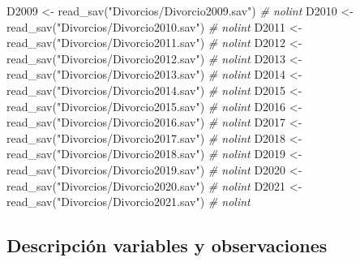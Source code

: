 \documentclass[
]{article}
\newenvironment{Shaded}{\begin{snugshade}}{\end{snugshade}}
\newcommand{\CommentTok}[1]{\textcolor[rgb]{0.56,0.35,0.01}{\textit{#1}}}
\newcommand{\FunctionTok}[1]{\textcolor[rgb]{0.00,0.00,0.00}{#1}}
\newcommand{\NormalTok}[1]{#1}
\newcommand{\OtherTok}[1]{\textcolor[rgb]{0.56,0.35,0.01}{#1}}
\newcommand{\StringTok}[1]{\textcolor[rgb]{0.31,0.60,0.02}{#1}}
\begin{document}
\begin{Shaded}
\begin{Highlighting}[]
\NormalTok{D2009 }\OtherTok{\textless{}{-}} \FunctionTok{read\_sav}\NormalTok{(}\StringTok{"Divorcios/Divorcio2009.sav"}\NormalTok{) }\CommentTok{\# nolint}
\NormalTok{D2010 }\OtherTok{\textless{}{-}} \FunctionTok{read\_sav}\NormalTok{(}\StringTok{"Divorcios/Divorcio2010.sav"}\NormalTok{) }\CommentTok{\# nolint}
\NormalTok{D2011 }\OtherTok{\textless{}{-}} \FunctionTok{read\_sav}\NormalTok{(}\StringTok{"Divorcios/Divorcio2011.sav"}\NormalTok{) }\CommentTok{\# nolint}
\NormalTok{D2012 }\OtherTok{\textless{}{-}} \FunctionTok{read\_sav}\NormalTok{(}\StringTok{"Divorcios/Divorcio2012.sav"}\NormalTok{) }\CommentTok{\# nolint}
\NormalTok{D2013 }\OtherTok{\textless{}{-}} \FunctionTok{read\_sav}\NormalTok{(}\StringTok{"Divorcios/Divorcio2013.sav"}\NormalTok{) }\CommentTok{\# nolint}
\NormalTok{D2014 }\OtherTok{\textless{}{-}} \FunctionTok{read\_sav}\NormalTok{(}\StringTok{"Divorcios/Divorcio2014.sav"}\NormalTok{) }\CommentTok{\# nolint}
\NormalTok{D2015 }\OtherTok{\textless{}{-}} \FunctionTok{read\_sav}\NormalTok{(}\StringTok{"Divorcios/Divorcio2015.sav"}\NormalTok{) }\CommentTok{\# nolint}
\NormalTok{D2016 }\OtherTok{\textless{}{-}} \FunctionTok{read\_sav}\NormalTok{(}\StringTok{"Divorcios/Divorcio2016.sav"}\NormalTok{) }\CommentTok{\# nolint}
\NormalTok{D2017 }\OtherTok{\textless{}{-}} \FunctionTok{read\_sav}\NormalTok{(}\StringTok{"Divorcios/Divorcio2017.sav"}\NormalTok{) }\CommentTok{\# nolint}
\NormalTok{D2018 }\OtherTok{\textless{}{-}} \FunctionTok{read\_sav}\NormalTok{(}\StringTok{"Divorcios/Divorcio2018.sav"}\NormalTok{) }\CommentTok{\# nolint}
\NormalTok{D2019 }\OtherTok{\textless{}{-}} \FunctionTok{read\_sav}\NormalTok{(}\StringTok{"Divorcios/Divorcio2019.sav"}\NormalTok{) }\CommentTok{\# nolint}
\NormalTok{D2020 }\OtherTok{\textless{}{-}} \FunctionTok{read\_sav}\NormalTok{(}\StringTok{"Divorcios/Divorcio2020.sav"}\NormalTok{) }\CommentTok{\# nolint}
\NormalTok{D2021 }\OtherTok{\textless{}{-}} \FunctionTok{read\_sav}\NormalTok{(}\StringTok{"Divorcios/Divorcio2021.sav"}\NormalTok{) }\CommentTok{\# nolint}
\end{Highlighting}
\end{Shaded}

\hypertarget{descripciuxf3n-variables-y-observaciones}{%
\subsection{Descripción variables y
observaciones}\label{descripciuxf3n-variables-y-observaciones}}
\end{document}
